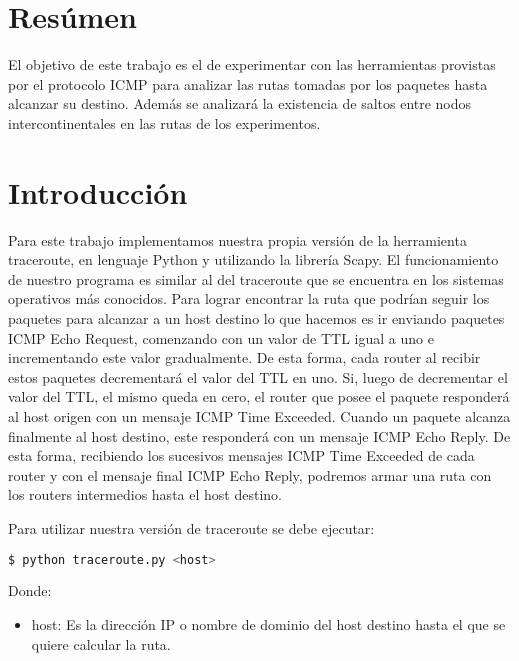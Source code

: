 \section{Resúmen}

El objetivo de este trabajo es el de experimentar con las herramientas provistas por el protocolo ICMP para analizar las rutas tomadas por los paquetes hasta alcanzar su destino. Además se analizará la existencia de saltos entre nodos intercontinentales en las rutas de los experimentos.

\section{Introducción}

Para este trabajo implementamos nuestra propia versión de la herramienta traceroute, en lenguaje Python y utilizando la librería Scapy. El funcionamiento de nuestro programa es similar al del traceroute que se encuentra en los sistemas operativos más conocidos. Para lograr encontrar la ruta que podrían seguir los paquetes para alcanzar a un host destino lo que hacemos es ir enviando paquetes ICMP Echo Request, comenzando con un valor de TTL igual a uno e incrementando este valor gradualmente. De esta forma, cada router al recibir estos paquetes decrementará el valor del TTL en uno. Si, luego de decrementar el valor del TTL, el mismo queda en cero, el router que posee el paquete responderá al host origen con un mensaje ICMP Time Exceeded. Cuando un paquete alcanza finalmente al host destino, este responderá con un mensaje ICMP Echo Reply. De esta forma, recibiendo los sucesivos mensajes ICMP Time Exceeded de cada router y con el mensaje final ICMP Echo Reply, podremos armar una ruta con los routers intermedios hasta el host destino.

Para utilizar nuestra versión de traceroute se debe ejecutar:

\begin{lstlisting}[language=bash]
  $ python traceroute.py <host> 
\end{lstlisting}

Donde:

\begin{itemize}
\item host: Es la dirección IP o nombre de dominio del host destino hasta el que se quiere calcular la ruta.
\end{itemize}